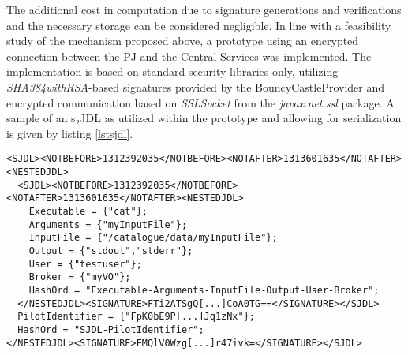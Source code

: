 \documentclass[10pt]{iopart}
\begin{document}
The additional cost in computation due to
signature generations and verifications and the necessary storage can be
considered negligible. In line with a feasibility study of the mechanism proposed above,
a prototype
using an encrypted connection between the PJ and the Central Services was
implemented. The implementation is
based on standard security libraries only, utilizing
\textit{SHA384withRSA}-based
signatures provided by the BouncyCastleProvider\cite{bouncy} and encrypted
communication based on \textit{SSLSocket} from the \textit{javax.net.ssl}
package. A sample of an s$_2$JDL as utilized within the prototype and allowing for
serialization is given by listing \ref{lstsjdl}.
\begin{lstlisting}[captionpos=b,caption=A sample s$_2$JDL (identifier
and signatures truncated),
label=lstsjdl,basicstyle=\ttfamily\fontsize{7}{11}\selectfont]
<SJDL><NOTBEFORE>1312392035</NOTBEFORE><NOTAFTER>1313601635</NOTAFTER><NESTEDJDL>
  <SJDL><NOTBEFORE>1312392035</NOTBEFORE><NOTAFTER>1313601635</NOTAFTER><NESTEDJDL>
    Executable = {"cat"};
    Arguments = {"myInputFile"};
    InputFile = {"/catalogue/data/myInputFile"};
    Output = {"stdout","stderr"};
    User = {"testuser"};
    Broker = {"myVO"};
    HashOrd = "Executable-Arguments-InputFile-Output-User-Broker";
  </NESTEDJDL><SIGNATURE>FTi2ATSgQ[...]CoA0TG==</SIGNATURE></SJDL>
  PilotIdentifier = {"FpK0bE9P[...]Jq1zNx"};
  HashOrd = "SJDL-PilotIdentifier";
</NESTEDJDL><SIGNATURE>EMQlV0Wzg[...]r47ivk=</SIGNATURE></SJDL>
\end{lstlisting}
\end{document}
